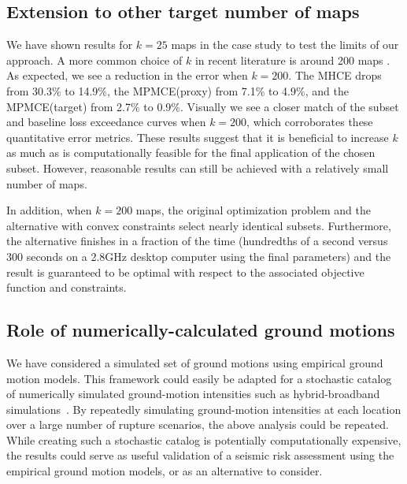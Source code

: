 \subsection{Extension to other target number of maps}
We have shown results for $k=25$ maps in the case study to test the limits of our approach. A more common choice of $k$ in recent literature is around 200 maps  \cite{han_probabilistic_2012, jayaram_efficient_2010}. As expected, we see a reduction in the error when $k=200$.
The MHCE drops from 30.3\% to 14.9\%, the MPMCE(proxy) from 7.1\% to 4.9\%, and the MPMCE(target) from 2.7\% to 0.9\%. Visually we see a closer match of the subset and baseline loss exceedance curves when $k=200$, which corroborates these quantitative error metrics. These results suggest that it is beneficial to increase $k$ as much as is computationally feasible for the final application of the chosen subset. However, reasonable results can still be achieved with a relatively small number of maps.

In addition, when $k=200$ maps,  the original optimization problem and the alternative with convex constraints select nearly identical subsets. Furthermore, the alternative finishes in a fraction of the time (hundredths of a second versus 300 seconds on a 2.8GHz desktop computer using the final parameters) and the result is guaranteed to be optimal with respect to the associated objective function and constraints.

\subsection{Role of numerically-calculated ground motions}
We have considered a simulated set of ground motions using empirical ground motion models. This framework could easily be adapted for a stochastic catalog of numerically simulated ground-motion intensities such as hybrid-broadband simulations~\cite[e.g.,][]{graves_broadband_2010}. By repeatedly simulating ground-motion intensities at each location over a large number of rupture scenarios, the above analysis could be repeated. While creating such a stochastic catalog is potentially computationally expensive, the results could serve as useful validation of a seismic risk assessment using the empirical ground motion models, or as an alternative to consider.


